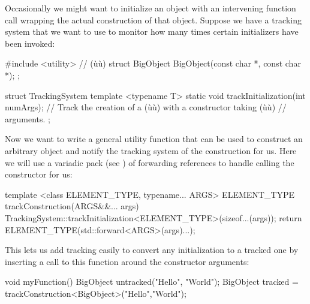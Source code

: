 Occasionally we might want to initialize an object with an intervening
function call wrapping the actual construction of that object. Suppose
we have a tracking system that we want to use to monitor how many times
certain initializers have been invoked:

\begin{emcppshiddenlisting}[emcppsbatch=e10]
#include <utility>      // (ù{}ù)
struct BigObject {
    BigObject(const char *, const char *);
};
\end{emcppshiddenlisting}
\begin{emcppslisting}[emcppsbatch=e10]
struct TrackingSystem
{
    template <typename T>
    static void trackInitialization(int numArgs);
        // Track the creation of a (ù{}ù) with a constructor taking (ù{}ù)
        // arguments.
};
\end{emcppslisting}

\noindent Now we want to write a general utility function that can be used to
construct an arbitrary object and notify the tracking system of the
construction for us. Here we will use a variadic pack (see ) 
of forwarding references to handle
calling the constructor for us:

\begin{emcppslisting}[emcppsbatch=e10]
template <class ELEMENT_TYPE, typename... ARGS>
ELEMENT_TYPE trackConstruction(ARGS&&... args)
{
    TrackingSystem::trackInitialization<ELEMENT_TYPE>(sizeof...(args));
    return ELEMENT_TYPE(std::forward<ARGS>(args)...);
}
\end{emcppslisting}

\noindent This lets us add tracking easily to convert any initialization to a
tracked one by inserting a call to this function around the constructor
arguments:

\begin{emcppslisting}[emcppsbatch=e10]
void myFunction()
{
    BigObject untracked("Hello", "World");
    BigObject tracked = trackConstruction<BigObject>("Hello","World");
}
\end{emcppslisting}

